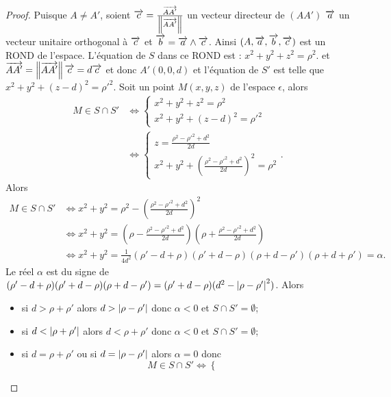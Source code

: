\begin{proof}
  Puisque \(A \neq A'\), soient \(\overrightarrow{c} = 
  \frac{\overrightarrow{AA'}}{\left\lVert\overrightarrow{AA'}\right\rVert}\) un vecteur directeur de \((AA')\) 
  \(\overrightarrow{a}\) un vecteur unitaire orthogonal à \(\overrightarrow{c}\) et \(\overrightarrow{b} = 
  \overrightarrow{a}\wedge\overrightarrow{c}\).  Ainsi \((A, \overrightarrow{a}, \overrightarrow{b}, \overrightarrow{c})\) est un ROND de l'espace.  
  L'équation de \(S\) dans ce ROND est : \(x^2 + y^2 + z^2 = \rho^2\). et 
  \(\overrightarrow{AA'} = \left\lVert\overrightarrow{AA'}\right\rVert\overrightarrow{c} = d\overrightarrow{c}\) et donc \(A'(0, 0, d)\) et 
  l'équation de \(S'\) est telle que \(x^2 + y^2 + (z - d)^2 = \rho'^2\).  
  Soit un point \(M(x, y, z)\) de l'espace \(\epsilon\), alors
  \begin{align}
    M \in S\cap S'
    & \iff
    \begin{cases}
      x^2 + y^2 + z^2 = \rho^2 \\
      x^2 + y^2 + (z - d)^2 = \rho'^2
    \end{cases} \\
    & \iff
    \begin{cases}
      z = \frac{\rho^2 - \rho'^2 + d^2}{2d}\\
      x^2 + y^2 + \left(\frac{\rho^2 - \rho'^2 + d^2}{2d}\right)^2 = \rho^2
    \end{cases}.
  \end{align}
  Alors
  \begin{align}
    M \in S\cap S'
    &\iff x^2 + y^2 = \rho^2 - \left(\frac{\rho^2 - \rho'^2 + 
    d^2}{2d}\right)^2\\
    &\iff x^2 + y^2 = \left(\rho - \frac{\rho^2 - \rho'^2 + 
    d^2}{2d}\right)\left(\rho + \frac{\rho^2 - \rho'^2 + d^2}{2d}\right)\\
    &\iff x^2 + y^2 = \frac{1}{4d^2}(\rho'-d + \rho)(\rho' + d - \rho)(\rho + d 
    - \rho')(\rho + d + \rho') = \alpha.
  \end{align}
  Le réel \(\alpha\) est du signe de \((\rho'-d + \rho)(\rho' + d - 
  \rho)(\rho + d - \rho') = (\rho' + d - \rho)(d^2 - \left\lvert\rho - 
  \rho'\right\rvert^2)\).  Alors
  \begin{itemize}
    \item si \(d>\rho + \rho'\) alors \(d>\left\lvert\rho - \rho'\right\rvert\) donc 
      \(\alpha<0\) et \(S\cap S' = \emptyset\);
    \item si \(d<\left\lvert\rho + \rho'\right\rvert\) alors \(d<\rho + \rho'\) donc 
      \(\alpha<0\) et \(S\cap S' = \emptyset\);
    \item si \(d = \rho + \rho'\) ou si \(d = \left\lvert\rho - \rho'\right\rvert\) alors 
      \(\alpha = 0\) donc
      \begin{equation}
        M\in S\cap S' \iff \begin{cases}

\end{cases}
\end{equation}
\end{itemize}
\end{proof}

